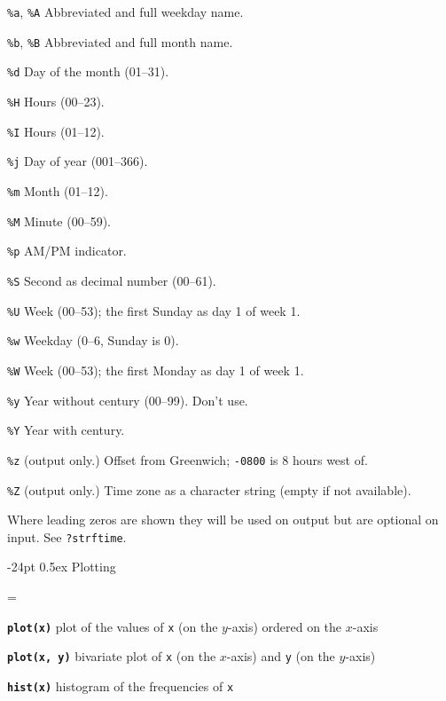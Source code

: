 \documentclass[10pt,landscape]{article}
\makeatletter
\renewcommand\section{\@startsection{section}{1}{0mm}%
                                     {-24pt}%
                                     {0.5ex}%
                                {\color{blue}\normalfont\large\bfseries}}
\newcommand{\code}{\texttt}
\newcommand{\bcode}[1]{\texttt{\textbf{#1}}}
\newcommand{\describe}[1]{\begin{description}{#1}\end{description}}
\makeatother
\begin{document}
\begin{multicols}{3}
  \describe{
\itemsep=0pt\parskip=0pt
    \item{\code{\%a}, \code{\%A}} {Abbreviated and full weekday name.}
    \item{\code{\%b}, \code{\%B}} {Abbreviated and full month name.}
    \item{\code{\%d}} {Day of the month (01--31).}
    \item{\code{\%H}} {Hours (00--23).}
    \item{\code{\%I}} {Hours (01--12).}
    \item{\code{\%j}} {Day of year (001--366).}
    \item{\code{\%m}} {Month (01--12).}
    \item{\code{\%M}} {Minute (00--59).}
    \item{\code{\%p}} {AM/PM indicator. }
    \item{\code{\%S}} {Second as decimal number (00--61).}
    \item{\code{\%U}} {Week (00--53); the first Sunday as day 1 of week 1.}
    \item{\code{\%w}} {Weekday (0--6, Sunday is 0).}
    \item{\code{\%W}} {Week (00--53); the first Monday as day 1 of week 1.}
    \item{\code{\%y}} {Year without century (00--99). Don't use.}
    \item{\code{\%Y}} {Year with century.}
    \item{\code{\%z}} {(output only.) Offset from Greenwich; \code{-0800} is 8 hours west of.}
    \item{\code{\%Z}} {(output only.) Time zone as a character
      string (empty if not available).}
  }

Where leading zeros are shown they will be used on output but are
optional on input. See \code{?strftime}.  





\section{Plotting}

\everypar={\hangindent=9mm}

\bcode{plot(x)}  plot of the values of \code{x} (on the $y$-axis) ordered on the $x$-axis

\bcode{plot(x, y)}  bivariate plot of \code{x} (on the $x$-axis) and \code{y} (on the $y$-axis)

\bcode{hist(x)}  histogram of the frequencies of \code{x}


\end{multicols}
\end{document}
